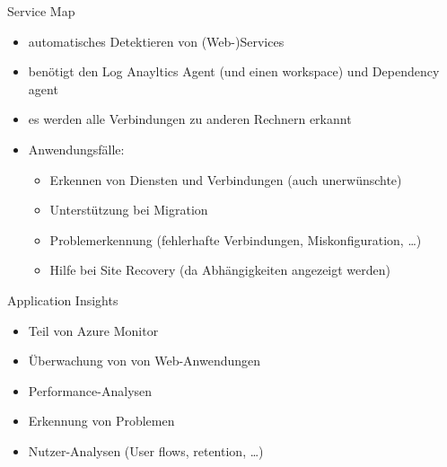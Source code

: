 \begin{flashcard}[]{Service Map}
  \begin{itemize}
    \item automatisches Detektieren von (Web-)Services
    \item benötigt den Log Anayltics Agent (und einen workspace) und Dependency agent
    \item es werden alle Verbindungen zu anderen Rechnern erkannt
    \item Anwendungsfälle:
      \begin{itemize}
        \item Erkennen von Diensten und Verbindungen (auch unerwünschte)
        \item Unterstützung bei Migration
        \item Problemerkennung (fehlerhafte Verbindungen, Miskonfiguration, \ldots)
        \item Hilfe bei Site Recovery (da Abhängigkeiten angezeigt werden)
      \end{itemize}
  \end{itemize}
\end{flashcard}

\begin{flashcard}[]{Application Insights}
  \begin{itemize}
    \item Teil von Azure Monitor
    \item Überwachung von von Web-Anwendungen
    \item Performance-Analysen
    \item Erkennung von Problemen
    \item Nutzer-Analysen (User flows, retention, \ldots)
  \end{itemize}
\end{flashcard}

